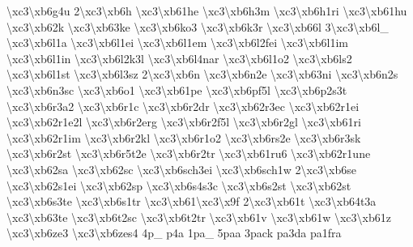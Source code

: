 {\textbackslash{}xc3\textbackslash{}xb6g4u 2\textbackslash{}xc3\textbackslash{}xb6h \textbackslash{}xc3\textbackslash{}xb61he \textbackslash{}xc3\textbackslash{}xb6h3m \textbackslash{}xc3\textbackslash{}xb6h1ri \textbackslash{}xc3\textbackslash{}xb61hu \textbackslash{}xc3\textbackslash{}xb62k \textbackslash{}xc3\textbackslash{}xb63ke \textbackslash{}xc3\textbackslash{}xb6ko3 \textbackslash{}xc3\textbackslash{}xb6k3r \textbackslash{}xc3\textbackslash{}xb66l 3\textbackslash{}xc3\textbackslash{}xb6l\-\_\- \textbackslash{}xc3\textbackslash{}xb6l1a \textbackslash{}xc3\textbackslash{}xb6l1ei \textbackslash{}xc3\textbackslash{}xb6l1em \textbackslash{}xc3\textbackslash{}xb6l2fei \textbackslash{}xc3\textbackslash{}xb6l1im \textbackslash{}xc3\textbackslash{}xb6l1in \textbackslash{}xc3\textbackslash{}xb6l2k3l \textbackslash{}xc3\textbackslash{}xb6l4nar \textbackslash{}xc3\textbackslash{}xb6l1o2 \textbackslash{}xc3\textbackslash{}xb6ls2 \textbackslash{}xc3\textbackslash{}xb6l1st \textbackslash{}xc3\textbackslash{}xb6l3sz 2\textbackslash{}xc3\textbackslash{}xb6n \textbackslash{}xc3\textbackslash{}xb6n2e \textbackslash{}xc3\textbackslash{}xb63ni \textbackslash{}xc3\textbackslash{}xb6n2s \textbackslash{}xc3\textbackslash{}xb6n3sc \textbackslash{}xc3\textbackslash{}xb6o1 \textbackslash{}xc3\textbackslash{}xb61pe \textbackslash{}xc3\textbackslash{}xb6pf5l \textbackslash{}xc3\textbackslash{}xb6p2s3t \textbackslash{}xc3\textbackslash{}xb6r3a2 \textbackslash{}xc3\textbackslash{}xb6r1c \textbackslash{}xc3\textbackslash{}xb6r2dr \textbackslash{}xc3\textbackslash{}xb62r3ec \textbackslash{}xc3\textbackslash{}xb62r1ei \textbackslash{}xc3\textbackslash{}xb62r1e2l \textbackslash{}xc3\textbackslash{}xb6r2erg \textbackslash{}xc3\textbackslash{}xb6r2f5l \textbackslash{}xc3\textbackslash{}xb6r2gl \textbackslash{}xc3\textbackslash{}xb61ri \textbackslash{}xc3\textbackslash{}xb62r1im \textbackslash{}xc3\textbackslash{}xb6r2kl \textbackslash{}xc3\textbackslash{}xb6r1o2 \textbackslash{}xc3\textbackslash{}xb6rs2e \textbackslash{}xc3\textbackslash{}xb6r3sk \textbackslash{}xc3\textbackslash{}xb6r2st \textbackslash{}xc3\textbackslash{}xb6r5t2e \textbackslash{}xc3\textbackslash{}xb6r2tr \textbackslash{}xc3\textbackslash{}xb61ru6 \textbackslash{}xc3\textbackslash{}xb62r1une \textbackslash{}xc3\textbackslash{}xb62sa \textbackslash{}xc3\textbackslash{}xb62sc \textbackslash{}xc3\textbackslash{}xb6sch3ei \textbackslash{}xc3\textbackslash{}xb6sch1w 2\textbackslash{}xc3\textbackslash{}xb6se \textbackslash{}xc3\textbackslash{}xb62s1ei \textbackslash{}xc3\textbackslash{}xb62sp \textbackslash{}xc3\textbackslash{}xb6s4s3c \textbackslash{}xc3\textbackslash{}xb6s2st \textbackslash{}xc3\textbackslash{}xb62st \textbackslash{}xc3\textbackslash{}xb6s3te \textbackslash{}xc3\textbackslash{}xb6s1tr \textbackslash{}xc3\textbackslash{}xb61\textbackslash{}xc3\textbackslash{}x9f 2\textbackslash{}xc3\textbackslash{}xb61t \textbackslash{}xc3\textbackslash{}xb64t3a \textbackslash{}xc3\textbackslash{}xb63te \textbackslash{}xc3\textbackslash{}xb6t2sc \textbackslash{}xc3\textbackslash{}xb6t2tr \textbackslash{}xc3\textbackslash{}xb61v \textbackslash{}xc3\textbackslash{}xb61w \textbackslash{}xc3\textbackslash{}xb61z \textbackslash{}xc3\textbackslash{}xb6ze3 \textbackslash{}xc3\textbackslash{}xb6zes4 4p\-\_\- p4a 1pa\-\_\- 5paa 3pack pa3da pa1fra }
